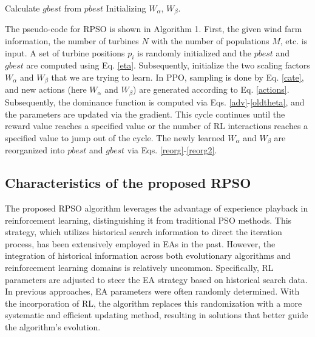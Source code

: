 \documentclass[review]{elsarticle}
\begin{document}
\begin{algorithm}[t]

	\caption{The pseudo-code of RPSO}
	\label{alg:SADE}
	Calculate $gbest$ from $pbest$\;
	Initializing $W_{\alpha}$, $W_{\beta}$.\;
\end{algorithm}
The pseudo-code for RPSO is shown in Algorithm 1. First, the given wind farm information, the number of turbines $N$ with the number of populations $M$, etc. is input. A set of turbine positions $p_{i}$ is randomly initialized and the $pbest$ and $gbest$ are computed using Eq. \eqref{eta}. Subsequently, initialize the two scaling factors $W_{\alpha}$ and $W_{\beta}$ that we are trying to learn. In PPO, sampling is done by Eq. \eqref{cate}, and new actions (here $W_{\alpha}$ and $W_{\beta}$) are generated according to Eq. \eqref{actions}. Subsequently, the dominance function is computed via Eqs. \eqref{adv}-\eqref{oldtheta}, and the parameters are updated via the gradient. This cycle continues until the reward value reaches a specified value or the number of RL interactions reaches a specified value to jump out of the cycle. The newly learned $W_{\alpha}$ and $W_{\beta}$ are reorganized into $pbest$ and $gbest$ via Eqs. \eqref{reorg}-\eqref{reorg2}.

\subsection{Characteristics of the proposed RPSO}
The proposed RPSO algorithm leverages the advantage of experience playback in reinforcement learning, distinguishing it from traditional PSO methods. This strategy, which utilizes historical search information to direct the iteration process, has been extensively employed in EAs in the past. However, the integration of historical information across both evolutionary algorithms and reinforcement learning domains is relatively uncommon. Specifically, RL parameters are adjusted to steer the EA strategy based on historical search data. In previous approaches, EA parameters were often randomly determined. With the incorporation of RL, the algorithm replaces this randomization with a more systematic and efficient updating method, resulting in solutions that better guide the algorithm's evolution.
\end{document}
